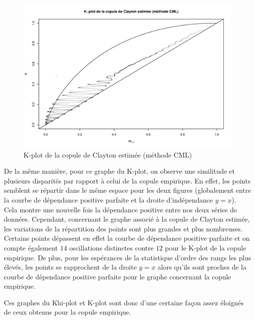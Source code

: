 \noindent%
\begin{figure}[H]
    \begin{center}
      \includegraphics[width=17 cm, angle=0]{./pictures/claytoncmlkplot.png}
      \centering\caption{\label{2}K-plot de la copule de Clayton estimée (méthode CML)}
    \end{center}
\end{figure}

De la même manière, pour ce graphe du K-plot, on observe une similitude et plusieurs disparités par rapport à celui de la copule empirique. En effet, les points semblent se répartir dans le même espace pour les deux figures (globalement entre la courbe de dépendance positive parfaite et la droite d'indépendance $y=x$). Cela montre une nouvelle fois la dépendance positive entre nos deux séries de données. Cependant, concernant le graphe associé à la copule de Clayton estimée, les variations de la répartition des points sont plus grandes et plus nombreuses. Certains points dépassent en effet la courbe de dépendance positive parfaite et on compte également $14$ oscillations distinctes contre $12$ pour le K-plot de la copule empirique. De plus, pour les espérances de la statistique d'ordre des rangs les plus élevés, les points se rapprochent de la droite $y=x$ alors qu'ils sont proches de la courbe de dépendance positive parfaite pour le graphe concernant la copule empirique.

Ces graphes du Khi-plot et K-plot sont donc d'une certaine façon assez éloignés de ceux obtenus pour la copule empirique.

